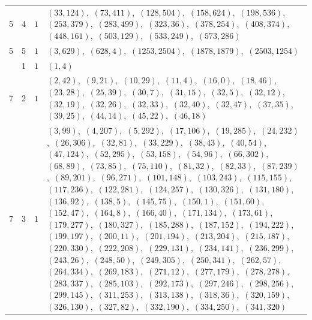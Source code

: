 \documentclass[11pt]{article}
\begin{document}
\begin{longtable}{@{}rrl>{\raggedright\arraybackslash}p{}@{}}
5 & 4 & $1$ & $(33,124)$,\allowbreak\ $(73,411)$,\allowbreak\ $(128,504)$,\allowbreak\ $(158,624)$,\allowbreak\ $(198,536)$,\allowbreak\ $(253,379)$,\allowbreak\ $(283,499)$,\allowbreak\ $(323,36)$,\allowbreak\ $(378,254)$,\allowbreak\ $(408,374)$,\allowbreak\ $(448,161)$,\allowbreak\ $(503,129)$,\allowbreak\ $(533,249)$,\allowbreak\ $(573,286)$\\
5 & 5 & $1$ & $(3,629)$,\allowbreak\ $(628,4)$,\allowbreak\ $(1253,2504)$,\allowbreak\ $(1878,1879)$,\allowbreak\ $(2503,1254)$\\
\addlinespace[3pt]
7 & 1 & $1$ & $(1,4)$\\
7 & 2 & $1$ & $(2,42)$,\allowbreak\ $(9,21)$,\allowbreak\ $(10,29)$,\allowbreak\ $(11,4)$,\allowbreak\ $(16,0)$,\allowbreak\ $(18,46)$,\allowbreak\ $(23,28)$,\allowbreak\ $(25,39)$,\allowbreak\ $(30,7)$,\allowbreak\ $(31,15)$,\allowbreak\ $(32,5)$,\allowbreak\ $(32,12)$,\allowbreak\ $(32,19)$,\allowbreak\ $(32,26)$,\allowbreak\ $(32,33)$,\allowbreak\ $(32,40)$,\allowbreak\ $(32,47)$,\allowbreak\ $(37,35)$,\allowbreak\ $(39,25)$,\allowbreak\ $(44,14)$,\allowbreak\ $(45,22)$,\allowbreak\ $(46,18)$\\
7 & 3 & $1$ & $(3,99)$,\allowbreak\ $(4,207)$,\allowbreak\ $(5,292)$,\allowbreak\ $(17,106)$,\allowbreak\ $(19,285)$,\allowbreak\ $(24,232)$,\allowbreak\ $(26,306)$,\allowbreak\ $(32,81)$,\allowbreak\ $(33,229)$,\allowbreak\ $(38,43)$,\allowbreak\ $(40,54)$,\allowbreak\ $(47,124)$,\allowbreak\ $(52,295)$,\allowbreak\ $(53,158)$,\allowbreak\ $(54,96)$,\allowbreak\ $(66,302)$,\allowbreak\ $(68,89)$,\allowbreak\ $(73,85)$,\allowbreak\ $(75,110)$,\allowbreak\ $(81,32)$,\allowbreak\ $(82,33)$,\allowbreak\ $(87,239)$,\allowbreak\ $(89,201)$,\allowbreak\ $(96,271)$,\allowbreak\ $(101,148)$,\allowbreak\ $(103,243)$,\allowbreak\ $(115,155)$,\allowbreak\ $(117,236)$,\allowbreak\ $(122,281)$,\allowbreak\ $(124,257)$,\allowbreak\ $(130,326)$,\allowbreak\ $(131,180)$,\allowbreak\ $(136,92)$,\allowbreak\ $(138,5)$,\allowbreak\ $(145,75)$,\allowbreak\ $(150,1)$,\allowbreak\ $(151,60)$,\allowbreak\ $(152,47)$,\allowbreak\ $(164,8)$,\allowbreak\ $(166,40)$,\allowbreak\ $(171,134)$,\allowbreak\ $(173,61)$,\allowbreak\ $(179,277)$,\allowbreak\ $(180,327)$,\allowbreak\ $(185,288)$,\allowbreak\ $(187,152)$,\allowbreak\ $(194,222)$,\allowbreak\ $(199,197)$,\allowbreak\ $(200,11)$,\allowbreak\ $(201,194)$,\allowbreak\ $(213,204)$,\allowbreak\ $(215,187)$,\allowbreak\ $(220,330)$,\allowbreak\ $(222,208)$,\allowbreak\ $(229,131)$,\allowbreak\ $(234,141)$,\allowbreak\ $(236,299)$,\allowbreak\ $(243,26)$,\allowbreak\ $(248,50)$,\allowbreak\ $(249,305)$,\allowbreak\ $(250,341)$,\allowbreak\ $(262,57)$,\allowbreak\ $(264,334)$,\allowbreak\ $(269,183)$,\allowbreak\ $(271,12)$,\allowbreak\ $(277,179)$,\allowbreak\ $(278,278)$,\allowbreak\ $(283,337)$,\allowbreak\ $(285,103)$,\allowbreak\ $(292,173)$,\allowbreak\ $(297,246)$,\allowbreak\ $(298,256)$,\allowbreak\ $(299,145)$,\allowbreak\ $(311,253)$,\allowbreak\ $(313,138)$,\allowbreak\ $(318,36)$,\allowbreak\ $(320,159)$,\allowbreak\ $(326,130)$,\allowbreak\ $(327,82)$,\allowbreak\ $(332,190)$,\allowbreak\ $(334,250)$,\allowbreak\ $(341,320)$\\

\end{longtable}
\end{document}
